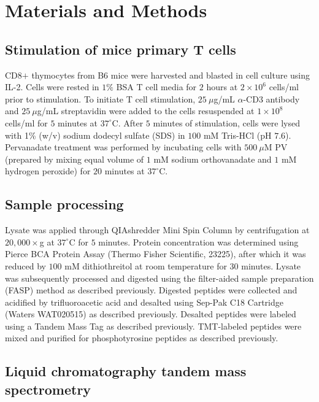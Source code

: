 \documentclass[journal=jprobs,manuscript=article]{achemso}
\begin{document}
\section{Materials and Methods}



\subsection{Stimulation of mice primary T cells}

CD8$+$ thymocytes from B6 mice were harvested and blasted in cell culture using IL-2. Cells were rested in $1\%$ BSA T cell media for $2$ hours at $2\times 10^6$ cells/ml prior to stimulation. To initiate T cell stimulation, $25 \ \mu$g/mL $\alpha$-CD3 antibody and $25 \ \mu$g/mL streptavidin were added to the cells resuspended at $1\times 10^8$ cells/ml for $5$ minutes at $37^{\circ}$C. After $5$ minutes of stimulation, cells were lysed with 1\% (w/v) sodium dodecyl sulfate (SDS) in $100$ mM Tris-HCl (pH $7.6$). Pervanadate treatment was performed by incubating cells with $500 \ \mu$M PV (prepared by mixing equal volume of $1$ mM sodium orthovanadate and $1$ mM hydrogen peroxide) for $20$ minutes at $37^{\circ}$C.

\subsection{Sample processing}

Lysate was applied through QIAshredder Mini Spin Column by centrifugation at $20{,}000\times$g at $37^{\circ}$C for $5$ minutes. Protein concentration was determined using Pierce BCA Protein Assay (Thermo Fisher Scientific, 23225), after which it was reduced by $100$ mM dithiothreitol at room temperature for $30$ minutes. Lysate was subsequently processed and digested using the filter-aided sample preparation (FASP) method\cite{wisniewski2009universal} as described previously. Digested peptides were collected and acidified by trifluoroacetic acid and desalted using Sep-Pak C18 Cartridge (Waters WAT020515) as described previously\cite{ahsan2017quantitative}. Desalted peptides were labeled using a Tandem Mass Tag as described previously\cite{chua2020tandem}. TMT-labeled peptides were mixed and purified for phosphotyrosine peptides as described previously\cite{chua2020tandem}.

\subsection{Liquid chromatography tandem mass spectrometry}
\end{document}
